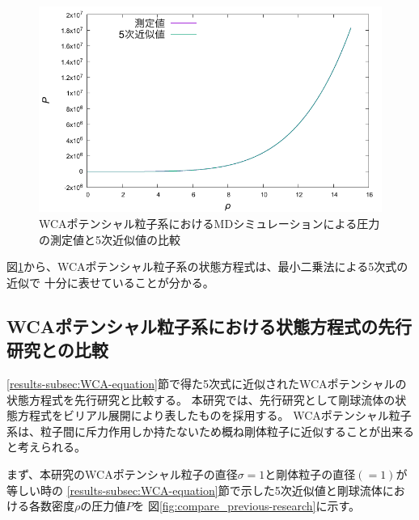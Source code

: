 \documentclass[titlepage]{jsreport}
\begin{document}
{{{\begin{figure}[htbp]
    \begin{center}
        \includegraphics[width=14cm]{fig/5den-pre.pdf}
    \end{center}
    \caption{WCAポテンシャル粒子系におけるMDシミュレーションによる圧力の測定値と5次近似値の比較}
    \label{fig:5den-pre}
\end{figure}

\newpage
図\ref{fig:5den-pre}から、WCAポテンシャル粒子系の状態方程式は、最小二乗法による5次式の近似で
十分に表せていることが分かる。


\subsection{WCAポテンシャル粒子系における状態方程式の先行研究との比較}\label{results-subsec:previous-research}
\ref{results-subsec:WCA-equation}節で得た5次式に近似されたWCAポテンシャルの状態方程式を先行研究と比較する。
本研究では、先行研究として剛球流体の状態方程式をビリアル展開により表したものを採用する\cite{hard-sphere}。
WCAポテンシャル粒子系は、粒子間に斥力作用しか持たないため概ね剛体粒子に近似することが出来ると考えられる。

まず、本研究のWCAポテンシャル粒子の直径$\sigma=1$と剛体粒子の直径$(=1)$が等しい時の
\ref{results-subsec:WCA-equation}節で示した5次近似値と剛球流体における各数密度$\rho$の圧力値$P$を
図\ref{fig:compare_previous-research}に示す。

}}}
\end{document}
